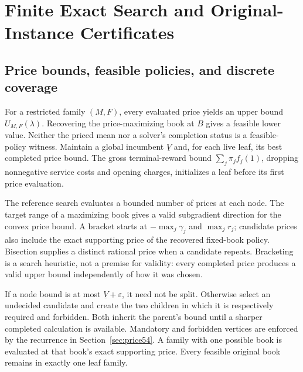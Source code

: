 \section{Finite Exact Search and Original-Instance Certificates}\label{sec:branch54}
\subsection{Price bounds, feasible policies, and discrete coverage}
For a restricted family $(M,F)$, every evaluated price yields an upper bound $U_{M,F}(\lambda)$. Recovering the price-maximizing book at $B$ gives a feasible lower value. Neither the priced mean nor a solver's completion status is a feasible-policy witness. Maintain a global incumbent $\underline V$ and, for each live leaf, its best completed price bound. The gross terminal-reward bound $\sum_j\pi_jf_j(1)$, dropping nonnegative service costs and opening charges, initializes a leaf before its first price evaluation.

The reference search evaluates a bounded number of prices at each node. The target range of a maximizing book gives a valid subgradient direction for the convex price bound. A bracket starts at $-\max_j\gamma_j$ and $\max_jr_j$; candidate prices also include the exact supporting price of the recovered fixed-book policy. Bisection supplies a distinct rational price when a candidate repeats. Bracketing is a search heuristic, not a premise for validity: every completed price produces a valid upper bound independently of how it was chosen.

If a node bound is at most $\underline V+\varepsilon$, it need not be split. Otherwise select an undecided candidate and create the two children in which it is respectively required and forbidden. Both inherit the parent's bound until a sharper completed calculation is available. Mandatory and forbidden vertices are enforced by the recurrence in Section~\ref{sec:price54}. A family with one possible book is evaluated at that book's exact supporting price. Every feasible original book remains in exactly one leaf family.

